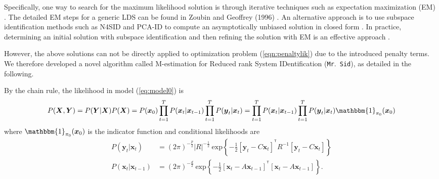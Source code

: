 \documentclass[fleqn,12pt]{article}
\let\oldref\ref
\renewcommand{\ref}[1]{(\oldref{#1})}
\newcommand{\T}{^{\ensuremath{\mathsf{T}}}}           %
\newcommand{\mrsid}{{\sc \texttt{Mr}.~\texttt{Sid}}}
\providecommand{\mb}[1]{\boldsymbol{#1}}
\newcommand{\bx}{\mb{x}}
\newcommand{\by}{\mb{y}}
\newcommand{\bX}{\mb{X}}
\newcommand{\bY}{\mb{Y}}
\begin{document}
Specifically, one way to search for the maximum likelihood solution is through iterative techniques such as expectation maximization (EM) \citep{shumway1982approach}. The detailed EM steps for a generic LDS can be found in Zoubin and Geoffrey (1996) \citep{ghahramani1996parameter}. An alternative approach is to use subspace identification methods such as N4SID and PCA-ID to compute an asymptotically unbiased solution in closed form \citep{van1994n4sid,doretto2003dynamic}. In practice, determining an initial solution with subspace identification and then refining the solution with EM is an effective approach \citep{bootslearning}.

However, the above solutions can not be directly applied to optimization problem \ref{eqn:penaltylik} due to the introduced penalty terms. We therefore developed a novel algorithm called M-estimation for Reduced rank System IDentification (\mrsid), as detailed in the following.

By the chain rule, the likelihood in model \ref{eq:model0} is
\begin{equation*}\label{eqn:likelihood}
P(\bX,\bY)=P(\bY|\bX) P(\bX)= P(\bx_0)\prod\limits_{t=1}^{T}P(\bx_t|\bx_{t-1})\prod\limits_{t=1}^{T} P(\by_t|\bx_t)=\prod\limits_{t=1}^{T}P(\bx_t|\bx_{t-1})\prod\limits_{t=1}^{T} P(\by_t|\bx_t)\mathbbm{1}_{\mathbf{\pi}_0}(\bx_0)
\end{equation*}
where $\mathbbm{1}_{\mathbf{\pi}_0}(\bx_0)$ is the indicator function and conditional likelihoods are
\begin{equation*}\label{eqn:condlik}
\begin{aligned}
P(\by_t|\bx_t)&= (2\pi)^{-\frac{p}{2}}|R|^{-\frac{1}{2}}\  \text{exp}\left\{-\frac{1}{2}[\by_t-C\bx_t]^{\T}R^{-1}[\by_t-C\bx_t]\right\}\\
P(\bx_t|\bx_{t-1})
&=(2\pi)^{-\frac{d}{2}}\  \text{exp}\left\{-\frac{1}{2}[\bx_t-A\bx_{t-1}]^{\T}[\bx_t-A\bx_{t-1}]\right\}.
\end{aligned}
\end{equation*}
\end{document}
